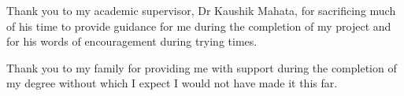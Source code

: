 \begin{acknowledgements}

Thank you to my academic supervisor, Dr Kaushik Mahata, for sacrificing much of his time to provide guidance for me during the completion of my project and for his words of encouragement during trying times.

Thank you to my family for providing me with support during the completion of my degree without which I expect I would not have made it this far.
\newpage
\end{acknowledgements}